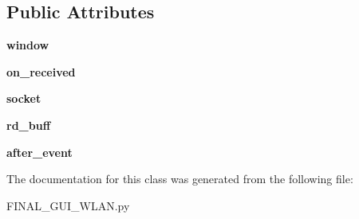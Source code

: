 \subsection*{Public Attributes}
\begin{DoxyCompactItemize}
\item 
\mbox{\label{class_f_i_n_a_l___g_u_i___w_l_a_n_1_1_arduino_a731b3fc58c501b945f1df4d2e8120112}} 
{\bfseries window}
\item 
\mbox{\label{class_f_i_n_a_l___g_u_i___w_l_a_n_1_1_arduino_aecdaccc57653078abe4ffe967cba361e}} 
{\bfseries on\+\_\+received}
\item 
\mbox{\label{class_f_i_n_a_l___g_u_i___w_l_a_n_1_1_arduino_a0728cfa43c874b9a4b8389f4b3215df0}} 
{\bfseries socket}
\item 
\mbox{\label{class_f_i_n_a_l___g_u_i___w_l_a_n_1_1_arduino_a220d4f39773ac5352c7ce4cd4bb89b7d}} 
{\bfseries rd\+\_\+buff}
\item 
\mbox{\label{class_f_i_n_a_l___g_u_i___w_l_a_n_1_1_arduino_a7858221e882d55f393ce792d56115341}} 
{\bfseries after\+\_\+event}
\end{DoxyCompactItemize}


The documentation for this class was generated from the following file\+:\begin{DoxyCompactItemize}
\item 
F\+I\+N\+A\+L\+\_\+\+G\+U\+I\+\_\+\+W\+L\+A\+N.\+py\end{DoxyCompactItemize}

